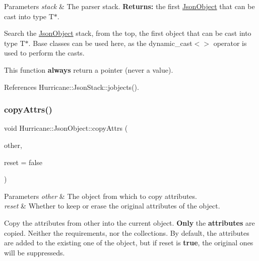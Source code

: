 \begin{DoxyParams}{Parameters}
{\em stack} & The parser stack. {\bfseries Returns\+:} the first \mbox{\hyperlink{classHurricane_1_1JsonObject}{Json\+Object}} that can be cast into type {\ttfamily T$\ast$}.\\
\hline
\end{DoxyParams}
Search the \mbox{\hyperlink{classHurricane_1_1JsonObject}{Json\+Object}} stack, from the top, the first object that can be cast into type {\ttfamily T$\ast$}. Base classes can be used here, as the {\ttfamily dynamic\+\_\+cast$<$$>$} operator is used to perform the casts.

This function {\bfseries always} return a pointer (never a value). 

References Hurricane\+::\+Json\+Stack\+::jobjects().

\mbox{\label{classHurricane_1_1JsonObject_a380ea9ac8689e1e9cad892edf0024c08}} 
\subsubsection{\texorpdfstring{copy\+Attrs()}{copyAttrs()}}
{\footnotesize\ttfamily void Hurricane\+::\+Json\+Object\+::copy\+Attrs (\begin{DoxyParamCaption}\item[{const \mbox{\hyperlink{classHurricane_1_1JsonObject}{Json\+Object}} $\ast$}]{other,  }\item[{bool}]{reset = {\ttfamily false} }\end{DoxyParamCaption})\hspace{0.3cm}{\ttfamily [inline]}}


\begin{DoxyParams}{Parameters}
{\em other} & The object from which to copy attributes. \\
\hline
{\em reset} & Whether to keep or erase the original attributes of the object.\\
\hline
\end{DoxyParams}
Copy the attributes from {\ttfamily other} into the current object. {\bfseries Only} the {\bfseries attributes} are copied. Neither the requirements, nor the collections. By default, the attributes are added to the existing one of the object, but if {\ttfamily reset} is {\bfseries true}, the original ones will be suppresseds. \mbox{\label{classHurricane_1_1JsonObject_a5f11139263926dbd8fe87b9c4480bdae}} 

